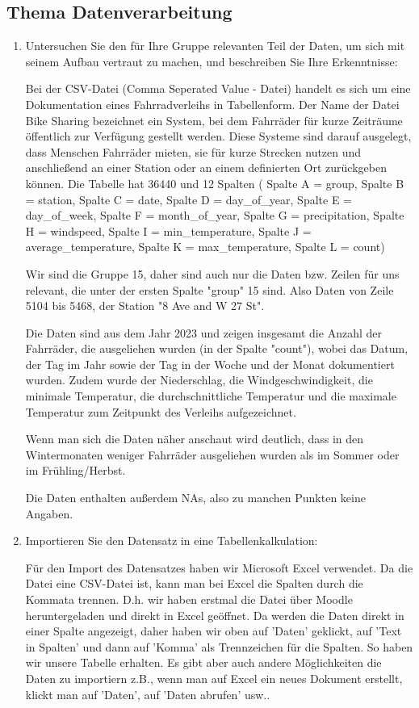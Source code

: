 \documentclass{article}
\begin{document}
\subsection{Thema Datenverarbeitung}
\begin{enumerate}
\item Untersuchen Sie den für Ihre Gruppe relevanten Teil der Daten, um sich mit seinem Aufbau vertraut zu machen, und beschreiben Sie Ihre Erkenntnisse:

Bei der CSV-Datei (Comma Seperated Value - Datei) handelt es sich um eine Dokumentation eines Fahrradverleihs in Tabellenform. Der Name der Datei Bike Sharing bezeichnet ein System, bei dem Fahrräder für kurze Zeiträume öffentlich zur Verfügung gestellt werden. Diese Systeme sind darauf ausgelegt, dass Menschen Fahrräder mieten, sie für kurze Strecken nutzen und anschließend an einer Station oder an einem definierten Ort zurückgeben können.
Die Tabelle hat 36440 und 12 Spalten ( Spalte A = group, Spalte B = station, Spalte C = date, Spalte D = day\_of\_year, Spalte E = day\_of\_week, Spalte F = month\_of\_year, Spalte G = precipitation, Spalte H = windspeed, Spalte I = min\_temperature, Spalte J = average\_temperature, Spalte K = max\_temperature, Spalte L = count)
    
Wir sind die Gruppe 15, daher sind auch nur die Daten bzw. Zeilen für uns relevant, die unter der ersten Spalte "group" 15 sind. Also Daten von Zeile 5104 bis 5468, der Station  "8 Ave and W 27 St".

Die Daten sind aus dem Jahr 2023 und zeigen insgesamt die Anzahl der Fahrräder, die ausgeliehen wurden (in der Spalte "count"), wobei das Datum, der Tag im Jahr sowie der Tag in der Woche und der Monat dokumentiert wurden. Zudem wurde der Niederschlag, die Windgeschwindigkeit, die minimale Temperatur, die durchschnittliche Temperatur und die maximale Temperatur zum Zeitpunkt des Verleihs aufgezeichnet.
    
Wenn man sich die Daten näher anschaut wird deutlich, dass in den Wintermonaten weniger Fahrräder ausgeliehen wurden als im Sommer oder im Frühling/Herbst.
    
Die Daten enthalten außerdem NAs, also zu manchen Punkten keine Angaben.
    
\item Importieren Sie den Datensatz in eine Tabellenkalkulation: 
    
Für den Import des Datensatzes haben wir Microsoft Excel verwendet. Da die Datei eine CSV-Datei ist, kann man bei Excel die Spalten durch die Kommata trennen. D.h. wir haben erstmal die Datei über Moodle heruntergeladen und direkt in Excel geöffnet. Da werden die Daten direkt in einer Spalte angezeigt, daher haben wir oben auf 'Daten' geklickt, auf 'Text in Spalten' und dann auf 'Komma' als Trennzeichen für die Spalten. So haben wir unsere Tabelle erhalten. Es gibt aber auch andere Möglichkeiten die Daten zu importiern z.B., wenn man auf Excel ein neues Dokument erstellt, klickt man auf 'Daten', auf 'Daten abrufen' usw..


\end{enumerate}
\end{document}
